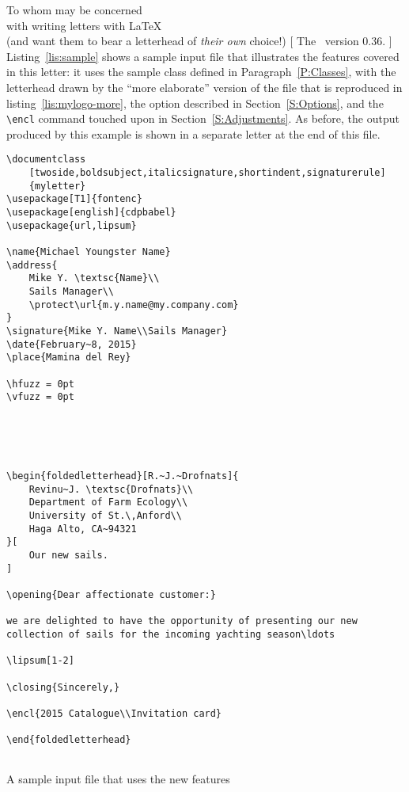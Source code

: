 \begin{letterhead}{
	To whom may be concerned\\
	with writing letters with \LaTeX\\
	(and want them to bear a letterhead
	of \emph{their own} choice!)
}[
	The \Bundle\ version 0.36.
]
Listing~\ref{lis:sample} shows a sample input file that illustrates the features
covered in this letter: it uses the  sample class defined in
Paragraph~\ref{P:Classes}, with the letterhead drawn by the ``more elaborate''
version of the  file that is reproduced in
listing~\ref{lis:mylogo-more}, the  option described in
Section~\ref{S:Options}, and the \verb|\encl| command touched upon in
Section~\ref{S:Adjustments}.  As before, the output produced by this example is
shown in a separate letter at the end of this file.

\begin{listing}[tbp]
	\cleantop
\begin{verbatim}
\documentclass
    [twoside,boldsubject,italicsignature,shortindent,signaturerule]
    {myletter}
\usepackage[T1]{fontenc}
\usepackage[english]{cdpbabel}
\usepackage{url,lipsum}

\name{Michael Youngster Name}
\address{
    Mike Y. \textsc{Name}\\
    Sails Manager\\
    \protect\url{m.y.name@my.company.com}
}
\signature{Mike Y. Name\\Sails Manager}
\date{February~8, 2015}
\place{Mamina del Rey}

\hfuzz = 0pt
\vfuzz = 0pt





\begin{foldedletterhead}[R.~J.~Drofnats]{
    Revinu~J. \textsc{Drofnats}\\
    Department of Farm Ecology\\
    University of St.\,Anford\\
    Haga Alto, CA~94321
}[
    Our new sails.
]

\opening{Dear affectionate customer:}

we are delighted to have the opportunity of presenting our new
collection of sails for the incoming yachting season\ldots

\lipsum[1-2]

\closing{Sincerely,}

\encl{2015 Catalogue\\Invitation card}

\end{foldedletterhead}


\end{verbatim}
	\caption{A sample input file that uses the new features}
	\label{lis:sample}
	\cleanbotp
\end{listing}




\end{letterhead}

